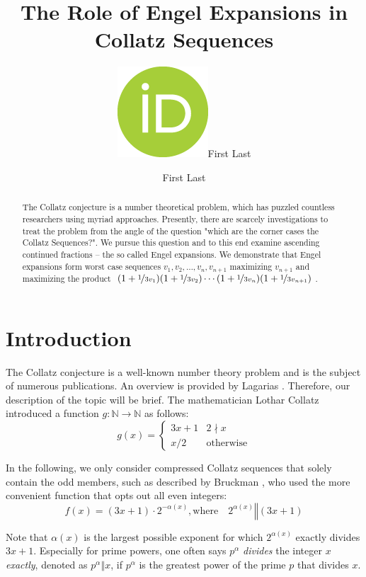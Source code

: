 \documentclass[12pt]{amsart}
\title[Engel Expansions in Collatz Sequences]{The Role of Engel Expansions in Collatz Sequences}
\author[F.\ Last1]{\href{https://orcid.org/0000-0000-0000-0000}{\includegraphics[scale=0.06]{orcid.png}}\hspace{1mm}First Last}
\author[F.\ Last2]{First Last}
\theoremstyle{definition}
\begin{document}
	
\begingroup
\let\MakeUppercase\relax
\maketitle
\endgroup

\begin{abstract}
The Collatz conjecture is a number theoretical problem, which has puzzled countless researchers using myriad approaches. Presently, there are scarcely investigations to treat the problem from the angle of the question "which are the corner cases the Collatz Sequences?". We pursue this question and to this end examine ascending continued fractions -- the so called Engel expansions. We demonstrate that Engel expansions form worst case sequences $v_1,v_2,\ldots,v_n,v_{n+1}$ maximizing $v_{n+1}$ and maximizing the product $(1+\nicefrac{1}{3v_1})(1+\nicefrac{1}{3v_2})\cdots(1+\nicefrac{1}{3v_n})(1+\nicefrac{1}{3v_{n+1}})$.
\end{abstract}

\section{Introduction}
\label{introduction}

The Collatz conjecture is a well-known number theory problem and is the subject of numerous publications. An overview is provided by Lagarias \cite{Ref_Lagarias_2010}. Therefore, our description of the topic will be brief. The mathematician Lothar Collatz introduced a function $g:\mathbb{N}\rightarrow\mathbb{N}$ as follows:
\begin{equation}
\label{eq:func_collatz}
g(x)=
\begin{cases}
3x+1	&	2\nmid x\\
x/2		&	\text{otherwise}
\end{cases}
\end{equation}

In the following, we only consider compressed Collatz sequences that solely contain the odd members, such as described by Bruckman \cite{Ref_Bruckman_2008}, who used the more convenient function that opts out all even integers:
\begin{equation}
\label{eq:func_collatz_odd}
f(x)=(3x+1)\cdot2^{-\alpha(x)},\text{where}\hspace{1em}2^{\alpha(x)}\mathrel\Vert(3x+1)
\end{equation}

Note that $\alpha(x)$ is the largest possible exponent for which $2^{\alpha(x)}$ exactly divides $3x+1$. Especially for prime powers, one often says $p^\alpha$ \textit{divides} the integer $x$ \textit{exactly}, denoted as $p^\alpha\mathrel\Vert x$, if $p^\alpha$ is the greatest power of the prime $p$ that divides $x$.
\end{document}
